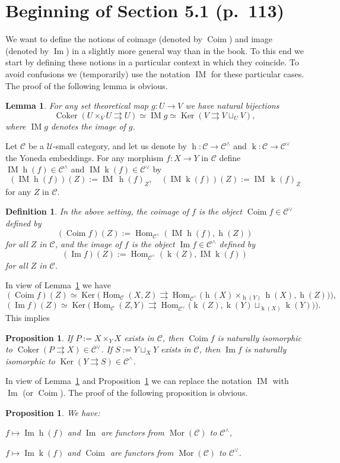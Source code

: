 \documentclass[12pt]{article}
\newtheorem{lem}[thm]{Lemma}
\newtheorem{prop}[thm]{Proposition}
\newtheorem{df}[thm]{Definition}%
\theoremstyle{remark}
\theoremstyle{definition}
\newcommand{\C}{\mathcal C}
\newcommand{\U}{\mathcal U}
\newcommand{\parar}{\rightrightarrows}\newcommand{\paralelarrows}{\rightrightarrows}%
\DeclareMathOperator{\Coim}{Coim}
\DeclareMathOperator{\Coker}{Coker}
\DeclareMathOperator{\Ima}{Im}
\DeclareMathOperator{\IM}{IM}
\DeclareMathOperator{\hy}{h}
\DeclareMathOperator{\ky}{k}
\DeclareMathOperator{\Hom}{Hom}%
\DeclareMathOperator{\Ker}{Ker}
\DeclareMathOperator{\Mor}{Mor}
\begin{document}
\section{Beginning of Section 5.1 (p.~113)} %
%
We want to define the notions of coimage (denoted by $\Coim$) and image (denoted by $\Ima$) in a slightly more general way than in the book. To this end we start by defining these notions in a particular context in which they coincide. To avoid confusions we (temporarily) use the notation $\IM$ for these particular cases. The proof of the following lemma is obvious. 
%
\begin{lem}\label{imset} 
For any set theoretical map $g:U\to V$ we have natural bijections 
$$ 
\Coker(U\times_VU\parar U)\simeq\IM g\simeq\Ker(V\parar V\sqcup_UV),
$$ 
where $\IM g$ denotes the image of $g$. 
\end{lem} 

Let $\C$ be a $\U$-small category, and let us denote by $\hy:\C\to\C^\wedge$ and $\ky:\C\to\C^\vee$ the Yoneda embeddings. For any morphism $f:X\to Y$ in $\C$ define $\IM\hy(f)\in\C^\wedge$ and $\IM\ky(f)\in\C^\vee$ by 
$$ 
(\IM\hy(f))(Z):=\IM\,\hy(f)_Z,\quad(\IM\ky(f))(Z):=\IM\,\ky(f)_Z 
$$ 
for any $Z$ in $\C$. 
%
\begin{df} 
In the above setting, the {\em coimage} of $f$ is the object $\Coim f\in\C^\vee$ defined by 
$$ 
(\Coim f)(Z):=\Hom_{\C^\wedge}(\IM\hy(f),\hy(Z))
$$ 
for all $Z$ in $\C$, and the {\em image} of $f$ is the object $\Ima f\in\C^\wedge$ defined by 
$$ 
(\Ima f)(Z):=\Hom_{\C^\vee}(\ky(Z),\IM\ky(f)) 
$$ 
for all $Z$ in $\C$. 
\end{df} 
%

In view of Lemma~\ref{imset} we have 
$$ 
(\Coim f)(Z)\simeq\Ker\Big(\Hom_\C(X,Z)\parar\Hom_{\C^\wedge}\big(\hy(X)\times_{\hy(Y)}\hy(X),\hy(Z)\big)\Big), 
$$ 
$$ 
(\Ima f)(Z)\simeq\Ker\Big(\Hom_\C(Z,Y)\parar\Hom_{\C^\vee}\big(\ky(Z),\ky(Y)\sqcup_{\ky(X)}\ky(Y)\big)\Big). 
$$ 
This implies 
%
\begin{prop}\label{coimim}
If $P:=X\times_YX$ exists in $\C$, then $\Coim f$ is naturally isomorphic to $\Coker(P\parar X)\in\C^\vee$. If $S:=Y\sqcup_XY$ exists in $\C$, then $\Ima f$ is naturally isomorphic to $\Ker(Y\parar S)\in\C^\wedge$. 
\end{prop} 
% 

In view of Lemma~\ref{imset} and Proposition~\ref{coimim} we can replace the notation $\IM$ with $\Ima$ (or $\Coim$). The proof of the following proposition is obvious. 
%
\begin{prop}\label{fun}
We have: 

$f\mapsto\Ima\hy(f)$ and $\Ima$ are functors from $\Mor(\C)$ to $\C^\wedge$, 

$f\mapsto\Ima\ky(f)$ and $\Coim$ are functors from $\Mor(\C)$ to $\C^\vee$. 
%
\end{prop} 
%
\end{document}
